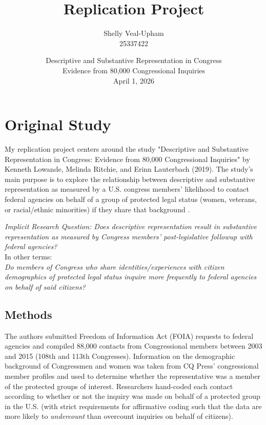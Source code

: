 \documentclass[12pt,letterpaper]{article}
\title{Replication Project}
\date{Descriptive and Substantive Representation in Congress \\ Evidence from 80,000 Congressional Inquiries\\ April 1, 2026}
\author{Shelly Veal-Upham\\
	25337422}
\begin{document}
	\maketitle
	\captionsetup[table]{labelformat=empty} 
	
	\section{Original Study}
	
	My replication project centers around the study "Descriptive and Substantive Representation in Congress: Evidence from 80,000 Congressional Inquiries" by Kenneth Lowande, Melinda Ritchie, and Erinn Lauterbach (2019). The study's main purpose is to explore the relationship between descriptive and substantive representation as measured by a U.S. congress members' likelihood to contact federal agencies on behalf of a group of protected legal status (women, veterans, or racial/ethnic minorities) if they share that background \parencite{lowande2019}.\\
	
	\begin{center}
		\noindent \textit{Implicit Research Question: Does descriptive representation result in substantive representation as measured by Congress members' post-legislative followup with federal agencies?} \\
		\vspace{0.2cm}
		In other terms:\\
		\vspace{0.2cm}
		\textit{Do members of Congress who share identities/experiences with citizen demographics of protected legal status inquire more frequently to federal agencies on behalf of said citizens?}\\
	\end{center}
	
	\subsection*{Methods}
	
	The authors submitted Freedom of Information Act (FOIA) requests to federal agencies and compiled 88,000 contacts from Congressional members between 2003 and 2015 (108th and 113th Congresses). Information on the demographic background of Congressmen and women was taken from CQ Press' congressional member profiles \parencite{cq_info} and used to determine whether the representative was a member of the protected groups of interest. Researchers hand-coded each contact according to whether or not the inquiry was made on behalf of a protected group in the U.S. (with strict requirements for affirmative coding such that the data are more likely to \textit{undercount} than overcount inquiries on behalf of citizens).\\
	
\end{document}
